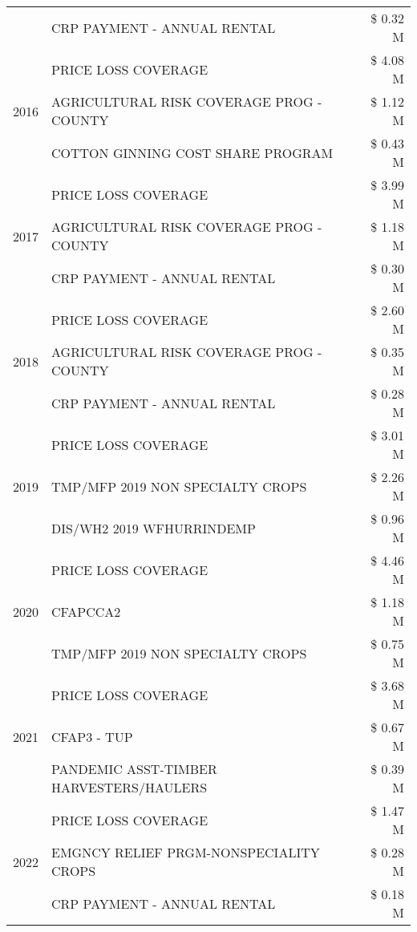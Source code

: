 \begin{tabular}{llr}
 & CRP PAYMENT - ANNUAL RENTAL & \$ 0.32 M \\
\cline{1-3}
\multirow[t]{3}{*}{2016} & PRICE LOSS COVERAGE & \$ 4.08 M \\
 & AGRICULTURAL RISK COVERAGE PROG - COUNTY & \$ 1.12 M \\
 & COTTON GINNING COST SHARE PROGRAM & \$ 0.43 M \\
\cline{1-3}
\multirow[t]{3}{*}{2017} & PRICE LOSS COVERAGE & \$ 3.99 M \\
 & AGRICULTURAL RISK COVERAGE PROG - COUNTY & \$ 1.18 M \\
 & CRP PAYMENT - ANNUAL RENTAL & \$ 0.30 M \\
\cline{1-3}
\multirow[t]{3}{*}{2018} & PRICE LOSS COVERAGE & \$ 2.60 M \\
 & AGRICULTURAL RISK COVERAGE PROG - COUNTY & \$ 0.35 M \\
 & CRP PAYMENT - ANNUAL RENTAL & \$ 0.28 M \\
\cline{1-3}
\multirow[t]{3}{*}{2019} & PRICE LOSS COVERAGE & \$ 3.01 M \\
 & TMP/MFP 2019 NON SPECIALTY CROPS & \$ 2.26 M \\
 & DIS/WH2 2019 WFHURRINDEMP & \$ 0.96 M \\
\cline{1-3}
\multirow[t]{3}{*}{2020} & PRICE LOSS COVERAGE & \$ 4.46 M \\
 & CFAPCCA2 & \$ 1.18 M \\
 & TMP/MFP 2019 NON SPECIALTY CROPS & \$ 0.75 M \\
\cline{1-3}
\multirow[t]{3}{*}{2021} & PRICE LOSS COVERAGE & \$ 3.68 M \\
 & CFAP3 - TUP & \$ 0.67 M \\
 & PANDEMIC ASST-TIMBER HARVESTERS/HAULERS & \$ 0.39 M \\
\cline{1-3}
\multirow[t]{3}{*}{2022} & PRICE LOSS COVERAGE & \$ 1.47 M \\
 & EMGNCY RELIEF PRGM-NONSPECIALITY CROPS & \$ 0.28 M \\
 & CRP PAYMENT - ANNUAL RENTAL & \$ 0.18 M \\
\cline{1-3}
\bottomrule
\end{tabular}
